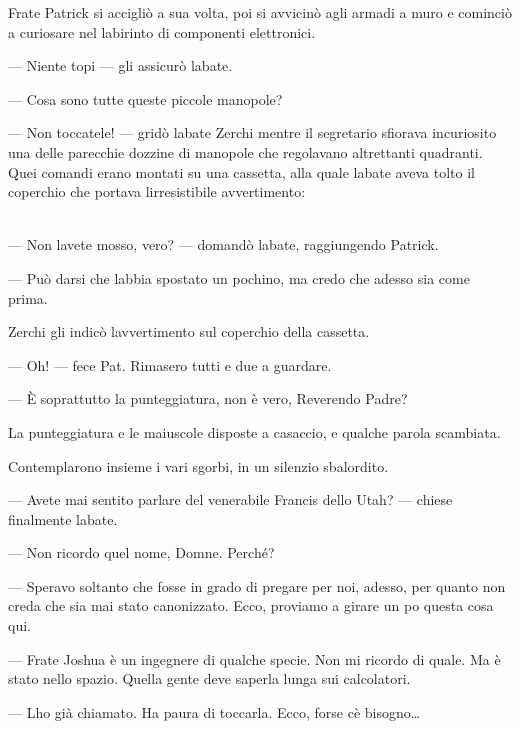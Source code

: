 	Frate Patrick si accigliò a sua volta, poi si avvicinò agli armadi a
	muro e cominciò a curiosare nel labirinto di componenti elettronici.
	
	--- Niente topi --- gli assicurò l\textquotesingle abate.
	
	--- Cosa sono tutte queste piccole manopole?
	
	--- Non toccatele! --- gridò l\textquotesingle abate Zerchi mentre il
	segretario sfiorava incuriosito una delle parecchie dozzine di manopole
	che regolavano altrettanti quadranti. Quei comandi erano montati su una
	cassetta, alla quale l\textquotesingle abate aveva tolto il coperchio
	che portava l\textquotesingle irresistibile avvertimento:
	
	\begin{center}
	\end{center}
	\leavevmode\\
	
	--- Non l\textquotesingle avete mosso, vero? --- domandò
	l\textquotesingle abate, raggiungendo Patrick.
	
	--- Può darsi che l\textquotesingle abbia spostato un pochino, ma credo
	che adesso sia come prima.
	
	Zerchi gli indicò l\textquotesingle avvertimento sul coperchio della
	cassetta.
	
	--- Oh! --- fece Pat. Rimasero tutti e due a guardare.
	
	--- È soprattutto la punteggiatura, non è vero, Reverendo Padre?
	
	La punteggiatura e le maiuscole disposte a casaccio, e qualche parola
	scambiata.
	
	Contemplarono insieme i vari sgorbi, in un silenzio sbalordito.
	
	--- Avete mai sentito parlare del venerabile Francis dello Utah? ---
	chiese finalmente l\textquotesingle abate.
	
	--- Non ricordo quel nome, Domne. Perché?
	
	--- Speravo soltanto che fosse in grado di pregare per noi, adesso, per
	quanto non creda che sia mai stato canonizzato. Ecco, proviamo a girare
	un po\textquotesingle{} questa cosa qui.
	
	--- Frate Joshua è un ingegnere di qualche specie. Non mi ricordo di
	quale. Ma è stato nello spazio. Quella gente deve saperla lunga sui
	calcolatori.
	
	--- L\textquotesingle ho già chiamato. Ha paura di toccarla. Ecco, forse
	c\textquotesingle è bisogno\ldots{}
	
